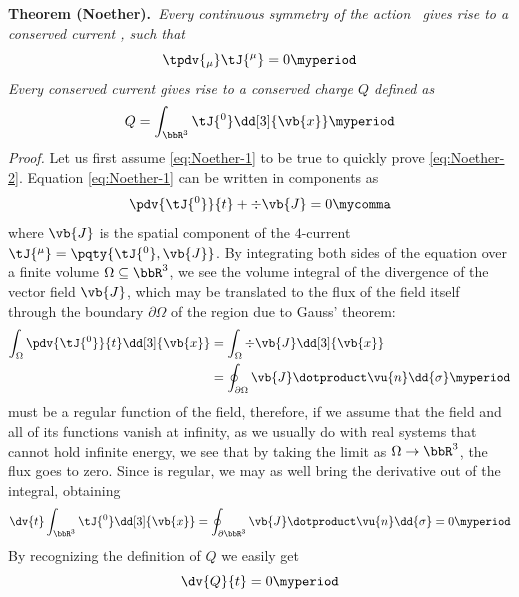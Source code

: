         \vspace{\baselineskip}
        {
            \noindent\textbf{Theorem (Noether).}\itshape\ Every continuous symmetry of the action \mcS\ gives rise to a conserved current \tJ{^\mu}, such that
            \begin{equation}
                \label{eq:Noether-1}
                \tpdv{_\mu}\tJ{^\mu} = 0
                \myperiod
            \end{equation}
            Every conserved current gives rise to a conserved charge $Q$ defined as
            \begin{equation}
                \label{eq:Noether-2}
                Q = \int\nolimits_{\bbR^3} \tJ{^0} \dd[3]{\vb{x}}
                \myperiod
            \end{equation}
        }
        \noindent\textit{Proof.} Let us first assume \eqref{eq:Noether-1} to be true to quickly prove \eqref{eq:Noether-2}. Equation \eqref{eq:Noether-1} can be written in components as 
        \begin{equation*}
            \pdv{\tJ{^0}}{t} + \div{\vb{J}} = 0
            \mycomma
        \end{equation*}
        where $\vb{J}$ is the spatial component of the $4$-current $\tJ{^\mu} = \pqty{\tJ{^0}, \vb{J}}$.
        By integrating both sides of the equation over a finite volume $\Omega \subseteq \bbR^3$, we see the volume integral of the divergence of the vector field $\vb{J}$, which may be translated to the flux of the field itself through the boundary $\partial\Omega$ of the region due to Gauss' theorem:
        \begin{align*}
            \int\nolimits_{\Omega} \pdv{\tJ{^0}}{t} \dd[3]{\vb{x}}
            &= \int\nolimits_{\Omega} \div{\vb{J}} \dd[3]{\vb{x}} \\
            &= \oint\nolimits_{\partial\Omega} {\vb{J}}\dotproduct\vu{n} \dd{\sigma}
            \myperiod
        \end{align*}
        \tJ{^\mu} must be a regular function of the field, therefore, if we assume that the field and all of its functions vanish at infinity, as we usually do with real systems that cannot hold infinite energy, we see that by taking the limit as $\Omega\to\bbR^3$, the flux goes to zero.
        Since \tJ{^\mu} is regular, we may as well bring the derivative out of the integral, obtaining
        \begin{equation*}
            \dv{t} \int\nolimits_{\bbR^3} \tJ{^0} \dd[3]{\vb{x}}
            = \oint\nolimits_{\partial\bbR^3} \vb{J}\dotproduct\vu{n} \dd{\sigma}
            = 0
            \myperiod
        \end{equation*}
        By recognizing the definition of $Q$ we easily get
        \begin{equation*}
            \dv{Q}{t} = 0
            \myperiod
        \end{equation*}

